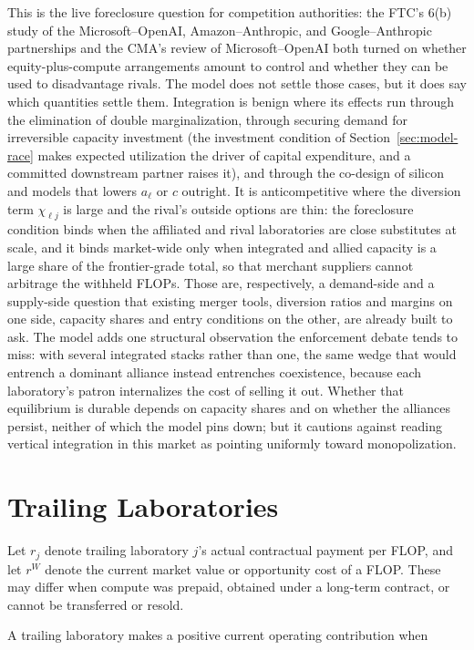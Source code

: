 \documentclass[11pt]{article}
\begin{document}
This is the live foreclosure question for competition authorities: the FTC's 6(b) study of the Microsoft--OpenAI, Amazon--Anthropic, and Google--Anthropic partnerships and the CMA's review of Microsoft--OpenAI both turned on whether equity-plus-compute arrangements amount to control and whether they can be used to disadvantage rivals. The model does not settle those cases, but it does say which quantities settle them. Integration is benign where its effects run through the elimination of double marginalization, through securing demand for irreversible capacity investment (the investment condition of Section~\ref{sec:model-race} makes expected utilization the driver of capital expenditure, and a committed downstream partner raises it), and through the co-design of silicon and models that lowers $a_\ell$ or $c$ outright. It is anticompetitive where the diversion term $\chi_{\ell j}$ is large and the rival's outside options are thin: the foreclosure condition binds when the affiliated and rival laboratories are close substitutes at scale, and it binds market-wide only when integrated and allied capacity is a large share of the frontier-grade total, so that merchant suppliers cannot arbitrage the withheld FLOPs. Those are, respectively, a demand-side and a supply-side question that existing merger tools, diversion ratios and margins on one side, capacity shares and entry conditions on the other, are already built to ask. The model adds one structural observation the enforcement debate tends to miss: with several integrated stacks rather than one, the same wedge that would entrench a dominant alliance instead entrenches coexistence, because each laboratory's patron internalizes the cost of selling it out. Whether that equilibrium is durable depends on capacity shares and on whether the alliances persist, neither of which the model pins down; but it cautions against reading vertical integration in this market as pointing uniformly toward monopolization.

\section{Trailing Laboratories}
\label{sec:trailing-labs}

Let $r_j$ denote trailing laboratory $j$'s actual contractual payment per FLOP, and let $r^W$ denote the current market value or opportunity cost of a FLOP. These may differ when compute was prepaid, obtained under a long-term contract, or cannot be transferred or resold.

A trailing laboratory makes a positive current operating contribution when
\end{document}
